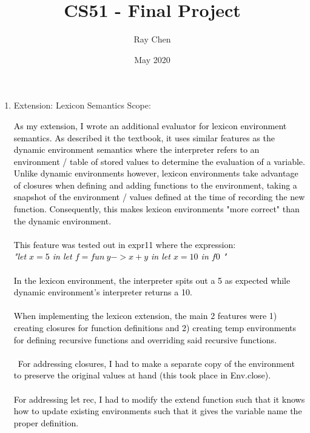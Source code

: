 \documentclass[11pt]{article}
\title{CS51 - Final Project}
\author{Ray Chen}
\date{May 2020}
\begin{document}
\maketitle

\begin{enumerate}

\item Extension: Lexicon Semantics Scope:

\textcolor{black}{
As my extension, I wrote an additional evaluator for lexicon environment semantics. As described it the textbook, it uses similar features as the dynamic environment semantics where the interpreter refers to an environment / table of stored values to determine the evaluation of a variable. Unlike dynamic environments however, lexicon environments take advantage of closures when defining and adding functions to the environment, taking a snapshot of the environment / values defined at the time of recording the new function. Consequently, this makes lexicon environments "more correct" than the dynamic environment.\\\\
This feature was tested out in expr11 where the expression:\\
\textit{"let $x = 5$ in let $f = fun \: y -> x + y$ in let $x = 10$ in $f 0$ "}\\\\
In the lexicon environment, the interpreter spits out a 5 as expected while dynamic environment's interpreter returns a 10. \\\\
When implementing the lexicon extension, the main 2 features were 1) creating closures for function definitions and 2) creating temp environments for defining recursive functions and overriding said recursive functions.\\\\\
For addressing closures, I had to make a separate copy of the environment to preserve the original values at hand (this took place in Env.close).\\\\
For addressing let rec, I had to modify the extend function such that it knows how to update existing environments such that it gives the variable name the proper definition.
}

\end{enumerate}
\end{document}
